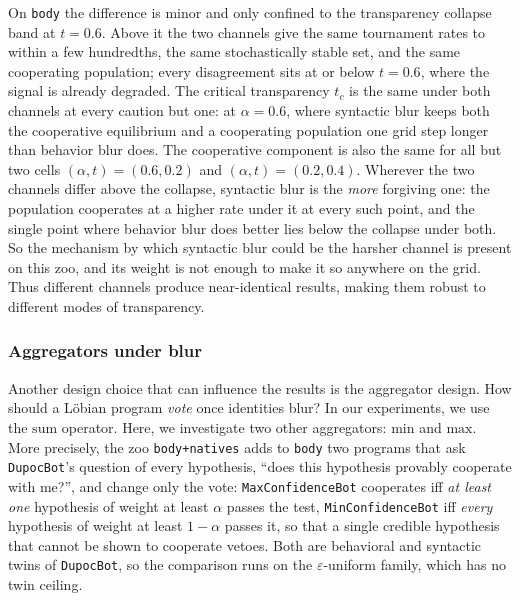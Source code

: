 \documentclass[twoside,11pt]{article}
\begin{document}
On \texttt{body} the difference is minor and only confined to the transparency collapse band at $t=0.6$. Above it the two channels give the same tournament rates to within a few hundredths, the same stochastically stable set, and the same cooperating population; every disagreement sits at or below $t = 0.6$, where the signal is already degraded. The critical transparency $t_c$ is the same under both channels at every caution but one: at $\alpha = 0.6$, where syntactic blur keeps both the cooperative equilibrium and a cooperating population one grid step longer than behavior blur does. The cooperative component is also the same for all but two cells $(\alpha,t)=(0.6, 0.2)$ and $(\alpha,t)=(0.2, 0.4)$. Wherever the two channels differ above the collapse, syntactic blur is the \emph{more} forgiving one: the population cooperates at a higher rate under it at every such point, and the single point where behavior blur does better lies below the collapse under both. So the mechanism by which syntactic blur could be the harsher channel is present on this zoo, and its weight is not enough to make it so anywhere on the grid. Thus different channels produce near-identical results, making them robust to different modes of transparency.



\subsubsection{Aggregators under blur}
\label{apx-subsubsection:Experiments-Transparency-Aggregators}
Another design choice that can influence the results is the aggregator design. How should a Löbian program \emph{vote} once identities blur? In our experiments, we use the $\mathrm{sum}$ operator. Here, we investigate two other aggregators: $\mathrm{min}$ and $\mathrm{max}$. More precisely, the zoo \texttt{body+natives} adds to \texttt{body} two programs that ask \texttt{DupocBot}'s question of every hypothesis, \enquote{does this hypothesis provably cooperate with me?}, and change only the vote: \texttt{MaxConfidenceBot} cooperates iff \emph{at least one} hypothesis of weight at least $\alpha$ passes the test, \texttt{MinConfidenceBot} iff \emph{every} hypothesis of weight at least $1-\alpha$ passes it, so that a single credible hypothesis that cannot be shown to cooperate vetoes. Both are behavioral and syntactic twins of \texttt{DupocBot}, so the comparison runs on the $\varepsilon$-uniform family, which has no twin ceiling. 
\end{document}
